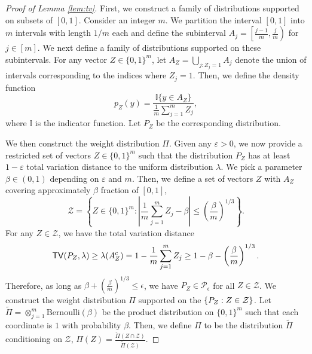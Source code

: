 \begin{proof}[Proof of Lemma \ref{lem:tv}]
First, we construct a family of distributions supported on subsets of $[0,1]$. Consider an integer $m$. We partition the interval $[0,1]$ into $m$ intervals with length $1/m$ each and define the subinterval $A_j=\left[\frac{j-1}{m},\frac{j}{m}\right)$ for $j \in [m]$. 
We next define a family of distributions supported on these subintervals. 
For any vector $Z\in\{0,1\}^m$, let $A_Z=\bigcup_{j:Z_j=1}A_j$ denote the union of intervals corresponding to the indices where $Z_j = 1$. Then, we define the density function $$p_Z(y)=\frac{\mathbb{I}\{y\in A_Z\}}{\frac{1}{m}\sum_{j=1}^mZ_j},$$
where $\mathbb{I}$ is the indicator function.
Let $P_Z$ be the corresponding distribution.
 
We then construct the weight distribution $\Pi$. 
Given any $\varepsilon > 0$, we now provide a restricted set of vectors $Z \in \{0,1\}^m$ such that the distribution $P_Z$ has at least $1-\varepsilon$ total variation distance to the uniform distribution $\lambda$. We pick a parameter $\beta \in (0,1)$ depending on $\varepsilon$ and $m$. Then, we define a set of vectors $Z$ with $A_Z$ covering approximately $\beta$ fraction of $[0,1]$, 
$$\mathcal{Z}=\left\{Z\in\{0,1\}^m:\left|\frac{1}{m}\sum_{j=1}^mZ_j-\beta\right|\leq\left(\frac{\beta}{m}\right)^{1/3}\right\}.$$
For any $Z\in\mathcal{Z}$, we have the total variation distance 
$${\sf TV}(P_Z,\lambda) \geq \lambda(A_Z^c)=1-\frac{1}{m}\sum_{j=1}^mZ_j\geq 1-\beta-\left(\frac{\beta}{m}\right)^{1/3}.$$ 
Therefore, as long as $\beta+\left(\frac{\beta}{m}\right)^{1/3}\leq\epsilon$, we have $P_Z\in\mathcal{P}_{\epsilon}$ for all $Z\in\mathcal{Z}$.
We construct the weight distribution $\Pi$ supported on the $\{P_Z: Z \in \mathcal{Z}\}$. Let $\tilde{\Pi}=\otimes_{j=1}^m\text{Bernoulli}(\beta)$ be the product distribution on $\{0,1\}^m$ such that each coordinate is $1$ with probability $\beta$. Then, we define $\Pi$ to be the distribution $\tilde{\Pi}$ conditioning on $\mathcal{Z}$, $\Pi(Z)=\frac{\tilde{\Pi}(Z\cap\mathcal{Z})}{\tilde{\Pi}(\mathcal{Z})}$. 



\end{proof}
